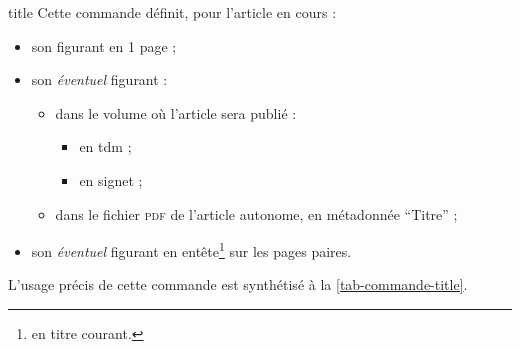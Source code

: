 \documentclass[french,nolocaltoc]{nwejmart}
\newtheorem[title=Fait,style=definition]{fact}
\begin{document}
\begin{docCommand}[doc new=2017-10-23]{title}{}
  Cette commande définit, pour l'article en cours :
  \begin{itemize}
  \item son  figurant en 1\iere{} page ;
  \item son \emph{éventuel}  figurant :
    \begin{itemize}
    \item dans le volume où l'article sera publié :
      \begin{itemize}
      \item en \gls{tdm} ;
      \item en signet ;
      \end{itemize}
    \item dans le fichier \textsc{pdf} de l'article autonome, en métadonnée
      \enquote{Titre} ;
    \end{itemize}
  \item son \emph{éventuel}  figurant en
    entête\footnote{\Ie{} en titre courant.} sur les pages paires.
  \end{itemize}
  L'usage précis de cette commande est synthétisé à la
  \vref{tab-commande-title}.
\end{docCommand}
\end{document}
